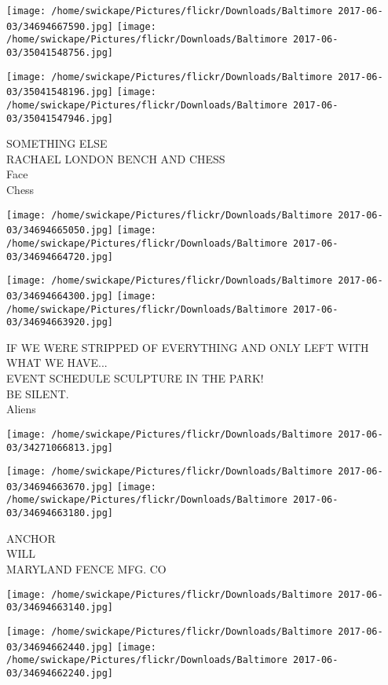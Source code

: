 \documentclass[10pt,letterpaper]{article}
\begin{document}
\texttt{[image: /home/swickape/Pictures/flickr/Downloads/Baltimore 2017-06-03/34694667590.jpg]}
\texttt{[image: /home/swickape/Pictures/flickr/Downloads/Baltimore 2017-06-03/35041548756.jpg]}

\texttt{[image: /home/swickape/Pictures/flickr/Downloads/Baltimore 2017-06-03/35041548196.jpg]}
\texttt{[image: /home/swickape/Pictures/flickr/Downloads/Baltimore 2017-06-03/35041547946.jpg]}

SOMETHING ELSE\\
RACHAEL LONDON BENCH AND CHESS\\
Face\\
Chess\\
\pagebreak

\texttt{[image: /home/swickape/Pictures/flickr/Downloads/Baltimore 2017-06-03/34694665050.jpg]}
\texttt{[image: /home/swickape/Pictures/flickr/Downloads/Baltimore 2017-06-03/34694664720.jpg]}

\texttt{[image: /home/swickape/Pictures/flickr/Downloads/Baltimore 2017-06-03/34694664300.jpg]}
\texttt{[image: /home/swickape/Pictures/flickr/Downloads/Baltimore 2017-06-03/34694663920.jpg]}

IF WE WERE STRIPPED OF EVERYTHING AND ONLY LEFT WITH WHAT WE HAVE...\\
EVENT SCHEDULE SCULPTURE IN THE PARK!\\
BE SILENT.\\
Aliens\\
\pagebreak

\texttt{[image: /home/swickape/Pictures/flickr/Downloads/Baltimore 2017-06-03/34271066813.jpg]}

\vspace{0.25in}
\texttt{[image: /home/swickape/Pictures/flickr/Downloads/Baltimore 2017-06-03/34694663670.jpg]}
\texttt{[image: /home/swickape/Pictures/flickr/Downloads/Baltimore 2017-06-03/34694663180.jpg]}

ANCHOR\\
WILL\\
MARYLAND FENCE MFG. CO\\
\pagebreak

\texttt{[image: /home/swickape/Pictures/flickr/Downloads/Baltimore 2017-06-03/34694663140.jpg]}

\vspace{0.25in}
\texttt{[image: /home/swickape/Pictures/flickr/Downloads/Baltimore 2017-06-03/34694662440.jpg]}
\texttt{[image: /home/swickape/Pictures/flickr/Downloads/Baltimore 2017-06-03/34694662240.jpg]}
\end{document}
